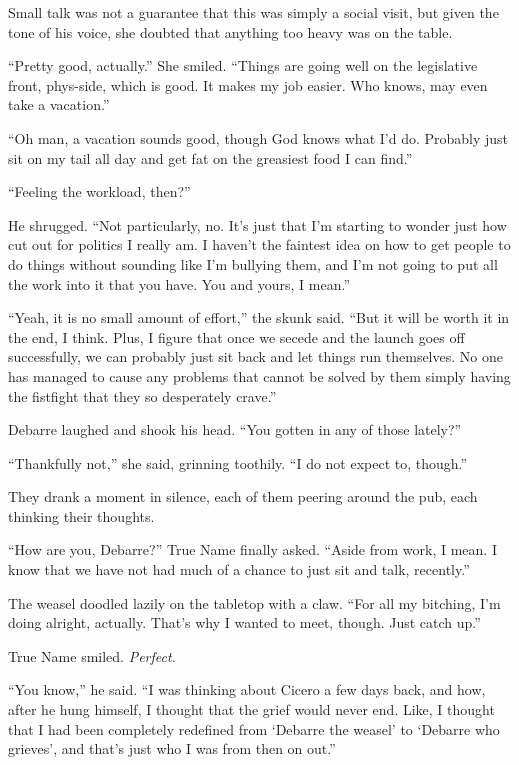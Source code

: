 Small talk was not a guarantee that this was simply a social visit, but given the tone of his voice, she doubted that anything too heavy was on the table.

``Pretty good, actually.'' She smiled. ``Things are going well on the legislative front, phys-side, which is good. It makes my job easier. Who knows, may even take a vacation.''

``Oh man, a vacation sounds good, though God knows what I'd do. Probably just sit on my tail all day and get fat on the greasiest food I can find.''

``Feeling the workload, then?''

He shrugged. ``Not particularly, no. It's just that I'm starting to wonder just how cut out for politics I really am. I haven't the faintest idea on how to get people to do things without sounding like I'm bullying them, and I'm not going to put all the work into it that you have. You and yours, I mean.''

``Yeah, it is no small amount of effort,'' the skunk said. ``But it will be worth it in the end, I think. Plus, I figure that once we secede and the launch goes off successfully, we can probably just sit back and let things run themselves. No one has managed to cause any problems that cannot be solved by them simply having the fistfight that they so desperately crave.''

Debarre laughed and shook his head. ``You gotten in any of those lately?''

``Thankfully not,'' she said, grinning toothily. ``I do not expect to, though.''

They drank a moment in silence, each of them peering around the pub, each thinking their thoughts.

``How are you, Debarre?'' True Name finally asked. ``Aside from work, I mean. I know that we have not had much of a chance to just sit and talk, recently.''

The weasel doodled lazily on the tabletop with a claw. ``For all my bitching, I'm doing alright, actually. That's why I wanted to meet, though. Just catch up.''

True Name smiled. \emph{Perfect.}

``You know,'' he said. ``I was thinking about Cicero a few days back, and how, after he hung himself, I thought that the grief would never end. Like, I thought that I had been completely redefined from `Debarre the weasel' to `Debarre who grieves', and that's just who I was from then on out.''

